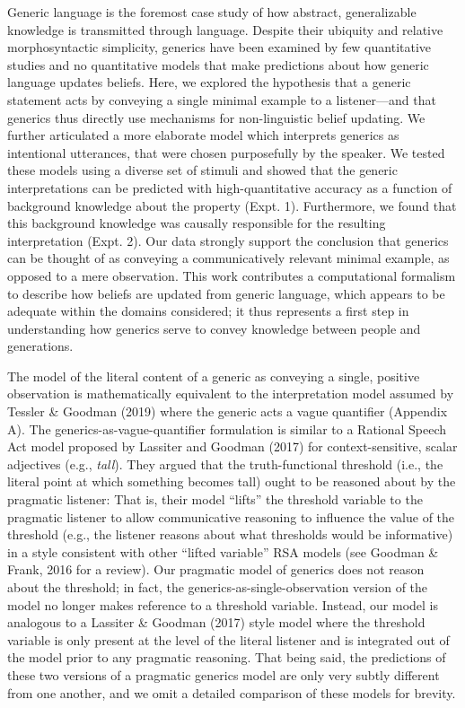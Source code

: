 \documentclass[floatsintext,doc]{apa6}
\begin{document}
Generic language is the foremost case study of how abstract, generalizable knowledge is transmitted through language.
Despite their ubiquity and relative morphosyntactic simplicity, generics have been examined by few quantitative studies and no quantitative models that make predictions about how generic language updates beliefs.
Here, we explored the hypothesis that a generic statement acts by conveying a single minimal example to a listener---and that generics thus directly use mechanisms for non-linguistic belief updating.
We further articulated a more elaborate model which interprets generics as intentional utterances, that were chosen purposefully by the speaker.
We tested these models using a diverse set of stimuli and showed that the generic interpretations can be predicted with high-quantitative accuracy as a function of background knowledge about the property (Expt. 1).
Furthermore, we found that this background knowledge was causally responsible for the resulting interpretation (Expt. 2).
Our data strongly support the conclusion that generics can be thought of as conveying a communicatively relevant minimal example, as opposed to a mere observation. 
This work contributes a computational formalism to describe how beliefs are updated from generic language, which appears to be adequate within the domains considered; it thus represents a first step in understanding how generics serve to convey knowledge between people and generations.


The model of the literal content of a generic as conveying a single, positive observation is mathematically equivalent to the interpretation model assumed by Tessler \& Goodman (2019) where the generic acts a vague quantifier (Appendix A). 
The generics-as-vague-quantifier formulation is similar to a Rational Speech Act model proposed by Lassiter and Goodman (2017) for context-sensitive, scalar adjectives (e.g., \emph{tall}).
They argued that the truth-functional threshold (i.e., the literal point at which something becomes tall) ought to be reasoned about by the pragmatic listener: That is, their model ``lifts'' the threshold variable to the pragmatic listener to allow communicative reasoning to influence the value of the threshold (e.g., the listener reasons about what thresholds would be informative) in a style consistent with other ``lifted variable'' RSA models (see Goodman \& Frank, 2016 for a review). 
Our pragmatic model of generics does not reason about the threshold; in fact, the generics-as-single-observation version of the model no longer makes reference to a threshold variable. 
Instead, our model is analogous to a Lassiter \& Goodman (2017) style model where the threshold variable is only present at the level of the literal listener and is integrated out of the model prior to any pragmatic reasoning. 
That being said, the predictions of these two versions of a pragmatic generics model are only very subtly different from one another, and we omit a detailed comparison of these models for brevity. 
\end{document}
